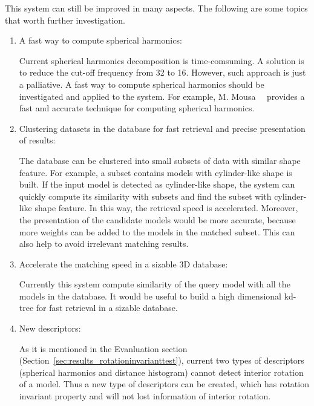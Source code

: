 This system can still be improved in many aspects. The following are some topics that worth further investigation.

\begin{enumerate}
\item A fast way to compute spherical harmonics: 

Current spherical harmonics decomposition is time-comsuming. A solution is to reduce the cut-off frequency from 32 to 16. However, such approach is just a palliative. A fast way to compute spherical harmonics should be investigated and applied to the system. For example, M. Mousa~\etal~\cite{mousa2006direct} provides a fast and accurate technique for computing spherical
harmonics.

\item Clustering datasets in the database for fast retrieval and precise presentation of results:

The database can be clustered into small subsets of data with similar shape feature. For example, a subset contains models with cylinder-like shape is built. If the input model is detected as cylinder-like shape, the system can quickly compute its similarity with subsets and find the subset with cylinder-like shape feature. In this way, the retrieval speed is accelerated. Moreover, the presentation of the candidate models would be more accurate, because more weights can be added to the models in the matched subset. This can also help to avoid irrelevant matching results. 

\item Accelerate the matching speed in a sizable 3D database: 

Currently this system compute similarity of the query model with all the models in the database. It would be useful to build a high dimensional kd-tree for fast retrieval in a sizable database. 

\item New descriptors:

As it is mentioned in the Evanluation section (Section~\ref{sec:results_rotationinvarianttest}), current two types of descriptors (spherical harmonics and distance histogram) cannot detect interior rotation of a model. Thus a new type of descriptors can be created, which has rotation invariant property and will not lost information of interior rotation. 

\end{enumerate}